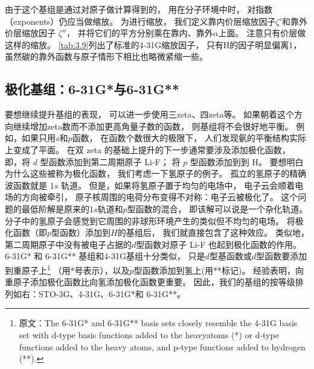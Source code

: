 由于这个基组是通过对原子做计算得到的，
用在分子环境中时，
对指数（exponents）仍应当做缩放。
为进行缩放，
我们定义靠内价层缩放因子$\zeta'$和靠外价层缩放因子 $\zeta''$，
并将它们的平方分别乘在靠内、靠外$\alpha$上面。 
注意只有价层做这样的缩放。
\ref{tab:3.9}列出了标准的4-31G缩放因子，
只有H的因子明显偏离1，
虽然碳的靠外函数与原子情形下相比也略微紧缩一些。


\subsection{极化基组：6-31G*与6-31G**}
要想继续提升基组的表现，
可以进一步使用三zeta、四zeta等。
如果朝着这个方向继续增加zeta数而不添加更高角量子数的函数，
则基组将不会很好地平衡。
例如，如果只用$s$和$p$函数，
在函数个数很大的极限下，
人们发现氨的平衡结构实际上变成了平面。
在双 zeta 的基础上提升的下一步通常要涉及添加极化函数，
即，将 $d$ 型函数添加到第二周期原子 Li-F；
将 $p$ 型函数添加到到 H。
要想明白为什么这些被称为极化函数，
我们考虑一下氢原子的例子。
孤立的氢原子的精确波函数就是 $1s$ 轨道。
但是，如果将氢原子置于均匀的电场中，
电子云会顺着电场的方向被牵引，
原子核周围的电荷分布变得不对称：电子云被极化了。
这个问题的最低阶解是原来的$1s$轨道和$p$型函数的混合，
即该解可以说是一个杂化轨道。
分子中的氢原子会感觉到它周围的非球形环境产生的类似但不均匀的电场。
将极化函数（即$p$型函数）添加到$H$的基组后，
我们就直接包含了这种效应。
类似地，
第二周期原子中没有被电子占据的$d$型函数对原子 Li-F 也起到极化函数的作用。
6-31G* 和 6-31G** 基组和4-31G基组十分类似，
只是$d$型基函数或$d$型函数要添加到重原子上\footnote{
原文：The 6-31G* and 6-31G** basis sets closely resemble the 4-31G basis set 
with d-type basis functions added to the heavyatoms (*) 
or d-type functions added to the heavy atoms, 
and p-type functions added to hydrogen (**).}
（用*号表示），以及$p$型函数添加到氢上(用**标记)。
经验表明，向重原子添加极化函数比向氢添加极化函数更重要。
因此，我们的基组的按等级排列如右：STO-3G、4-31G、6-31G*和 6-31G**。

